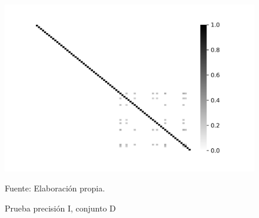 \begin{figure}[!h]
{\includegraphics[scale=0.41]{images/results/MAP_1222_WIN_W_15_K_5_PRECISION}}
\caption{Prueba precisión I, conjunto D}
Fuente: Elaboración propia.
\label{set_D_precision}
\end{figure}
